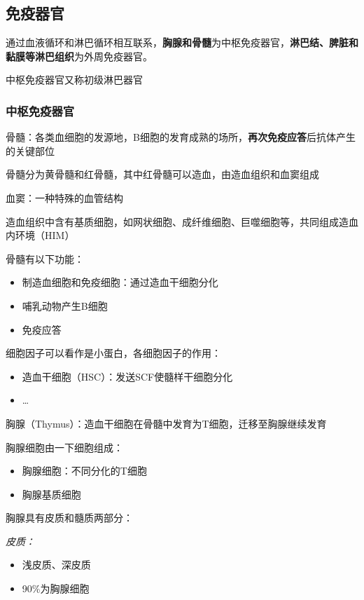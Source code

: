 \subsection{免疫器官}%
\label{sub:免疫器官}
通过血液循环和淋巴循环相互联系，\textbf{胸腺和骨髓}为中枢免疫器官，\textbf{淋巴结、脾脏和黏膜等淋巴组织}为外周免疫器官。

中枢免疫器官又称初级淋巴器官
\subsubsection*{中枢免疫器官}%
\label{subsub:中枢免疫器官}
\begin{notation}
    骨髓：各类血细胞的发源地，B细胞的发育成熟的场所，\textbf{再次免疫应答}后抗体产生的关键部位
\end{notation}
骨髓分为黄骨髓和红骨髓，其中红骨髓可以造血，由造血组织和血窦组成
\begin{defi}
    血窦：一种特殊的血管结构
\end{defi}
造血组织中含有基质细胞，如网状细胞、成纤维细胞、巨噬细胞等，共同组成造血内环境（HIM）

骨髓有以下功能：
\begin{itemize}
    \item 制造血细胞和免疫细胞：通过造血干细胞分化
    \item 哺乳动物产生B细胞
    \item 免疫应答
    
\end{itemize}
细胞因子可以看作是小蛋白，各细胞因子的作用：
\begin{itemize}
    \item 造血干细胞（HSC）：发送SCF使髓样干细胞分化
    \item \ldots 
\end{itemize}
\begin{notation}
    胸腺（Thymus）：造血干细胞在骨髓中发育为T细胞，迁移至胸腺继续发育
\end{notation}
胸腺细胞由一下细胞组成：
\begin{itemize}
    \item 胸腺细胞：不同分化的T细胞
    \item 胸腺基质细胞
\end{itemize}
胸腺具有皮质和髓质两部分：

\textit{皮质：}
\begin{itemize}
    \item 浅皮质、深皮质
    \item 90\%为胸腺细胞
\end{itemize}


